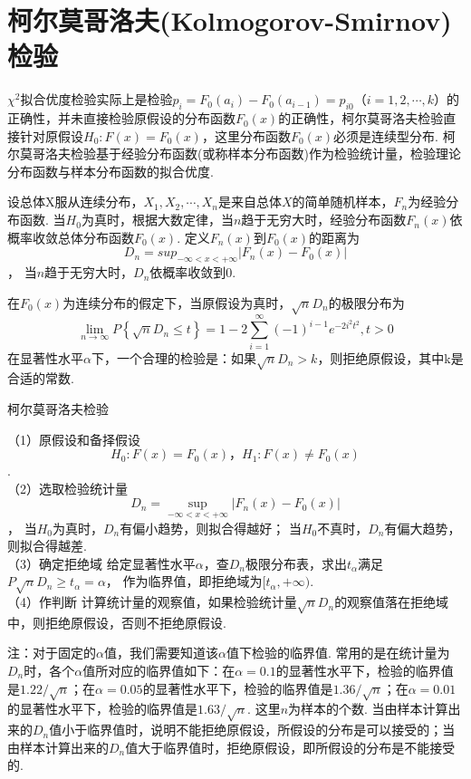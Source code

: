 \section{柯尔莫哥洛夫(Kolmogorov-Smirnov)检验}

$\chi^2$拟合优度检验实际上是检验$p_i=F_0(a_i)-F_0(a_{i-1})=p_{i0}（i=1,2,\cdots,k）$的正确性，并未直接检验原假设的分布函数$F_0(x)$的正确性，柯尔莫哥洛夫检验直接针对原假设$H_0:F(x)=F_0(x)$，这里分布函数$F_0(x)$必须是连续型分布. 柯尔莫哥洛夫检验基于经验分布函数(或称样本分布函数)作为检验统计量，检验理论分布函数与样本分布函数的拟合优度. 

设总体X服从连续分布，$X_1,X_2,\cdots,X_n$是来自总体$X$的简单随机样本，$F_n$为经验分布函数. 当$H_0$为真时，根据大数定律，当$n$趋于无穷大时，经验分布函数$F_n(x)$依概率收敛总体分布函数$F_0(x)$. 定义$F_n(x)$到$F_0(x)$的距离为
$$D_n={sup}_{-\infty<x<+\infty}\left|F_n(x)-F_0(x)\right|$$，
当$n$趋于无穷大时，$D_n$依概率收敛到$0$. 

\begin{theorem}[Kolmogorov定理]  
    在$F_0(x)$为连续分布的假定下，当原假设为真时，$\sqrt n D_n$的极限分布为
$$ \lim _{n \rightarrow \infty} P\left\{\sqrt{n} D_{n} \leq t\right\}=1-2 \sum_{i=1}^{\infty}(-1)^{i-1} e^{-2 i^{2} t^{2}}, t>0 $$  
在显著性水平$\alpha$下，一个合理的检验是：如果$\sqrt n D_n>k$，则拒绝原假设，其中k是合适的常数.    
\end{theorem}

\begin{algorithm}[]
    \caption{柯尔莫哥洛夫检验}
     （1）原假设和备择假设
$$  H_0:F(x)=F_0(x)，H_1:F(x)\neq F_0(x)$$.\\
（2）选取检验统计量
$$D_n=\operatorname{sup}_{-\infty<x<+\infty} \left|F_n(x)-F_0(x)\right|$$，
当$H_0$为真时，$D_n$有偏小趋势，则拟合得越好；
当$H_0$不真时，$D_n$有偏大趋势，则拟合得越差. \\
（3）确定拒绝域
给定显著性水平$\alpha$，查$D_n$极限分布表，求出$t_\alpha$满足
$P{\sqrt n D_n\geq t_\alpha}=\alpha$，
作为临界值，即拒绝域为$[t_\alpha,+\infty)$. \\
（4）作判断
计算统计量的观察值，如果检验统计量$\sqrt n D_n$的观察值落在拒绝域中，则拒绝原假设，否则不拒绝原假设.    
\end{algorithm}

注：对于固定的$\alpha$值，我们需要知道该$\alpha$值下检验的临界值. 常用的是在统计量为$D_n$时，各个$\alpha$值所对应的临界值如下：在$\alpha=0.1$的显著性水平下，检验的临界值是$1.22/\sqrt n$；在$\alpha=0.05$的显著性水平下，检验的临界值是$1.36/\sqrt n$；在$\alpha=0.01$的显著性水平下，检验的临界值是$1.63/\sqrt n$. 这里$n$为样本的个数. 当由样本计算出来的$D_n$值小于临界值时，说明不能拒绝原假设，所假设的分布是可以接受的；当由样本计算出来的$D_n$值大于临界值时，拒绝原假设，即所假设的分布是不能接受的. 


